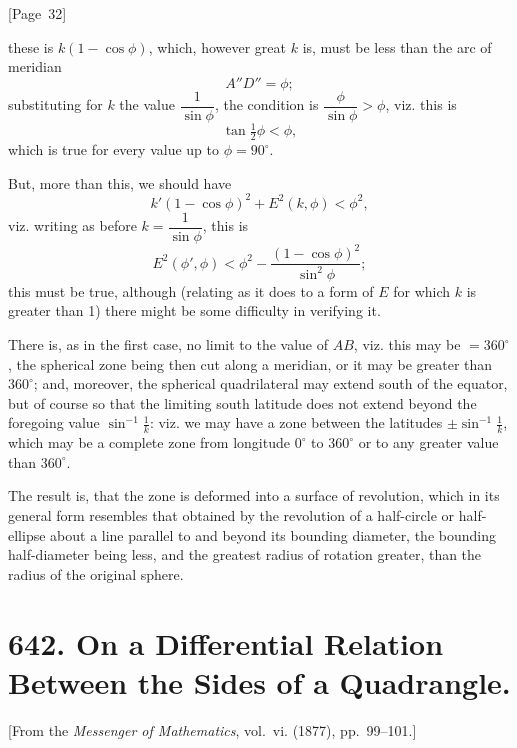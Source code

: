 \documentclass[11pt,a4paper]{book}
\begin{document}
\begin{center}
[Page~32]
\end{center}

these is $k(1-\cos\phi)$, which, however great $k$ is, must be less than
the arc of meridian
\[
A''D'' = \phi;
\]
substituting for $k$ the value $\dfrac{1}{\sin\phi}$, the condition is
$\dfrac{\phi}{\sin\phi} > \phi$, viz. this is
\[
\tan\tfrac{1}{2}\phi < \phi,
\]
which is true for every value up to $\phi = 90^\circ$.

But, more than this, we should have
\[
k'(1-\cos\phi)^2 + E^2(k,\phi) < \phi^2,
\]
viz. writing as before $k = \dfrac{1}{\sin\phi}$, this is
\[
E^2(\phi', \phi) < \phi^2 - \frac{(1-\cos\phi)^2}{\sin^2\phi};
\]
this must be true, although (relating as it does to a form of $E$ for
which $k$ is greater than 1) there might be some difficulty in verifying it.

There is, as in the first case, no limit to the value of $AB$,
viz. this may be $= 360^\circ$, the spherical zone being then cut along a
meridian, or it may be greater than $360^\circ$; and, moreover, the spherical
quadrilateral may extend south of the equator, but of course so that the
limiting south latitude does not extend beyond the foregoing value
$\sin^{-1}\tfrac{1}{k}$:
viz. we may have a zone between the latitudes
$\pm \sin^{-1}\tfrac{1}{k}$, which may be a complete zone from longitude
$0^\circ$ to $360^\circ$ or to any greater value than $360^\circ$.

The result is, that the zone is deformed into a surface of revolution,
which in its general form resembles that obtained by the revolution of a
half-circle or half-ellipse about a line parallel to and beyond its
bounding diameter, the bounding half-diameter being less, and the
greatest radius of rotation greater, than the radius of the original sphere.


\newpage
\section*{642. On a Differential Relation Between the Sides of a Quadrangle.}

[From the \textit{Messenger of Mathematics}, vol.~vi. (1877), pp.~99--101.]
\end{document}
